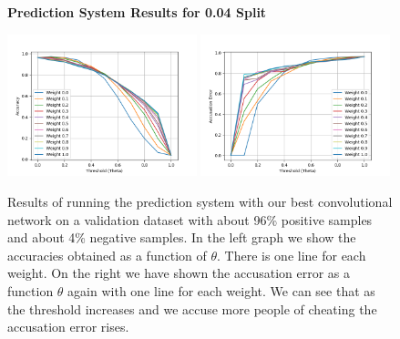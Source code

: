 \begin{figure}
    \centering
    \textbf{Prediction System Results for 0.04 Split}\par\medskip
    \includegraphics[width=0.49\textwidth]{./pictures/experiments/network3_prediction_system_accuracies_4_percent.png}
    \includegraphics[width=0.49\textwidth]{./pictures/experiments/network3_prediction_system_accusation_error_4_percent.png}
    \caption{Results of running the prediction system with our best
        convolutional network on a validation dataset with about 96\% positive
        samples and about 4\% negative samples. In the left graph we show the
        accuracies obtained as a function of $\theta$. There is one line for
        each weight. On the right we have shown the accusation error as a
        function $\theta$ again with one line for each weight. We can see that
        as the threshold increases and we accuse more people of cheating the
        accusation error rises.}
    \label{fig:prediction_system_results_2}
\end{figure}
